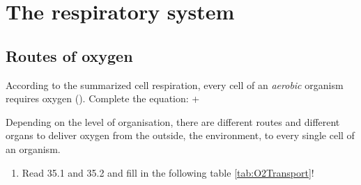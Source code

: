 \section{The respiratory system}\label{sec:RespiratorySystem}
\subsection{Routes of oxygen}
According to the summarized cell respiration, every cell of an \emph{aerobic} organism requires oxygen (). Complete the equation:   + 

		\begin{mdframed}[style=exampledefault, userdefinedwidth=12cm,frametitle={Starr, chapter 35.1 and 35.2}\label{mat:BEISPIELMATERIAL}]
		Depending on the level of organisation, there are different routes and different organs to deliver oxygen from the outside, the environment, to every single cell of an organism.
		\end{mdframed}

	 \begin{enumerate}[itemsep=1.5em, leftmargin=*]
	\item  Read  35.1 and 35.2 and fill in the following table \ref{tab:O2Transport}!
	\end{enumerate}

